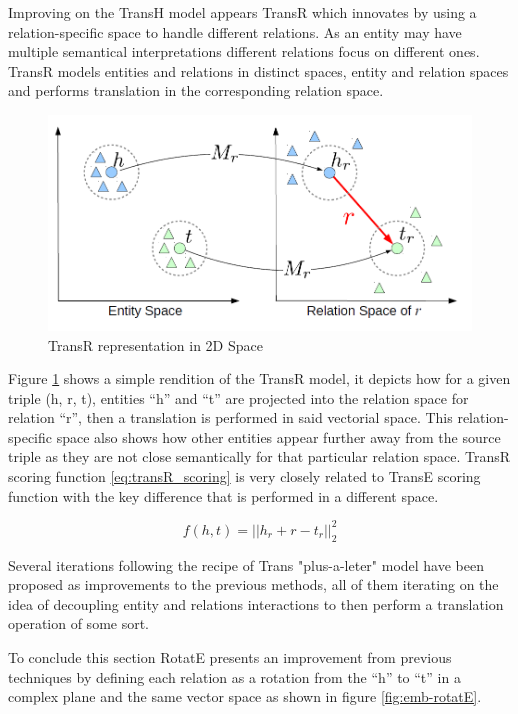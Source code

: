 Improving on the TransH model appears TransR\cite{lin2015learning} which innovates by using a relation-specific space to handle different relations. As an entity may have multiple semantical interpretations different relations focus on different ones. TransR models entities and relations in distinct spaces, entity and relation spaces and performs translation in the corresponding relation space.

\begin{figure}[!htp]
    \centering
    \includegraphics[width=.7\textwidth]{fig/embeddings/TransR.png}
    \caption{TransR\cite{lin2015learning} representation in 2D Space}
    \label{fig:emb-transR}
\end{figure}

Figure \ref{fig:emb-transR} shows a simple rendition of the TransR model, it depicts how for a given triple (h, r, t), entities ``h'' and ``t'' are projected into the relation space for relation ``r'', then a translation is performed in said vectorial space. This relation-specific space also shows how other entities appear further away from the source triple as they are not close semantically for that particular relation space. TransR scoring function \ref{eq:transR_scoring} is very closely related to TransE scoring function with the key difference that is performed in a different space.

\begin{equation}
    \label{eq:transR_scoring}
    f(h, t) = ||h_r + r - t_r||^2_2
\end{equation}

Several iterations following the recipe of Trans "plus-a-leter" model have been proposed as improvements to the previous methods, all of them iterating on the idea of decoupling entity and relations interactions to then perform a translation operation of some sort.

To conclude this section RotatE\cite{sun2019rotate} presents an improvement from previous techniques by defining each relation as a rotation from the ``h'' to ``t'' in a complex plane and the same vector space as shown in figure \ref{fig:emb-rotatE}.

